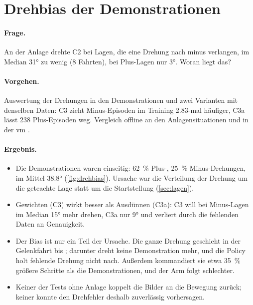 \section{Drehbias der Demonstrationen}
\label{sec:drehbias}

\paragraph{Frage.} An der Anlage drehte C2 bei Lagen, die eine Drehung nach minus verlangen,
im Median \ang{31} zu wenig (8 Fahrten), bei Plus-Lagen nur \ang{3}. Woran liegt das?

\paragraph{Vorgehen.} Auswertung der Drehungen in den Demonstrationen und zwei Varianten mit
denselben Daten: C3 zieht Minus-Episoden im Training \num{2.83}-mal häufiger, C3a lässt
238 Plus-Episoden weg. Vergleich offline an den Anlagensituationen und in der \ac{vm}
.

\paragraph{Ergebnis.}
\begin{itemize}
  \item Die Demonstrationen waren einseitig: \SI{62}{\percent} Plus-, \SI{25}{\percent}
    Minus-Drehungen, im Mittel \ang{+38.8} (\cref{fig:drehbias}). Ursache war die
    Verteilung der Drehung um die geteachte Lage statt um die Startstellung
    (\cref{sec:lagen}).
  \item Gewichten (C3) wirkt besser als Ausdünnen (C3a): C3 will bei Minus-Lagen im Median
    \ang{15} mehr drehen, C3a nur \ang{9} und verliert durch die fehlenden Daten an
    Genauigkeit.
  \item Der Bias ist nur ein Teil der Ursache. Die ganze Drehung geschieht in der Gelenkfahrt
    bis ; darunter dreht keine Demonstration mehr, und die Policy holt fehlende
    Drehung nicht nach. Außerdem kommandiert sie etwa \SI{35}{\percent} größere Schritte als
    die Demonstrationen, und der Arm folgt schlechter.
  \item Keiner der Tests ohne Anlage koppelt die Bilder an die Bewegung zurück; keiner konnte
    den Drehfehler deshalb zuverlässig vorhersagen.
\end{itemize}

